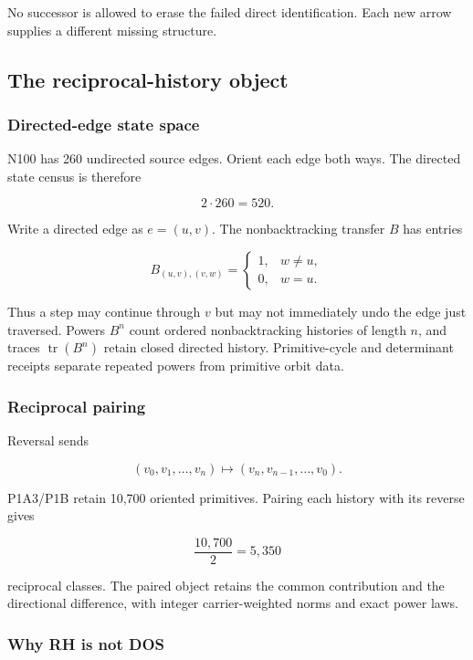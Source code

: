 No successor is allowed to erase the failed direct identification. Each
new arrow supplies a different missing structure.

\subsection{The reciprocal-history
object}\label{viii-ch09-the-reciprocal-history-object}

\subsubsection{Directed-edge state
space}\label{viii-ch09-directed-edge-state-space}

N100 has 260 undirected source edges. Orient each edge both ways. The
directed state census is therefore

\[
2\cdot260=520.
\]

Write a directed edge as \(e=(u,v)\). The nonbacktracking transfer \(B\)
has entries

\[
B_{(u,v),(v,w)}=
\begin{cases}
1,&w\ne u,\\
0,&w=u.
\end{cases}
\]

Thus a step may continue through \(v\) but may not immediately undo the
edge just traversed. Powers \(B^n\) count ordered nonbacktracking
histories of length \(n\), and traces \(\operatorname{tr}(B^n)\) retain
closed directed history. Primitive-cycle and determinant receipts
separate repeated powers from primitive orbit data.

\subsubsection{Reciprocal pairing}\label{viii-ch09-reciprocal-pairing}

Reversal sends

\[
(v_0,v_1,\ldots,v_n)
\longmapsto
(v_n,v_{n-1},\ldots,v_0).
\]

P1A3/P1B retain 10,700 oriented primitives. Pairing each history with
its reverse gives

\[
\frac{10{,}700}{2}=5{,}350
\]

reciprocal classes. The paired object retains the common contribution
and the directional difference, with integer carrier-weighted norms and
exact power laws.

\subsubsection{Why RH is not DOS}\label{viii-ch09-why-rh-is-not-dos}

